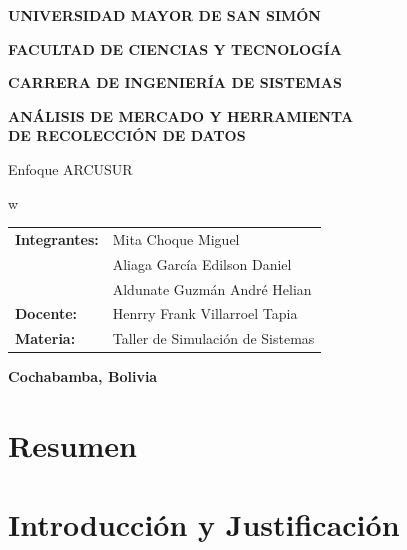 \documentclass[12pt, a4paper]{article}
\begin{document}


\setlength{\parindent}{0pt}

\begin{titlepage}
\centering
{\large\bfseries UNIVERSIDAD MAYOR DE SAN SIMÓN\par}
\vspace{4pt}
{\bfseries FACULTAD DE CIENCIAS Y TECNOLOGÍA\par}
\vspace{4pt}
{\bfseries CARRERA DE INGENIERÍA DE SISTEMAS\par}

\vspace*{\fill}
{\huge\bfseries ANÁLISIS DE MERCADO Y HERRAMIENTA\\DE RECOLECCIÓN DE DATOS\par}
\vspace{0.8cm}
{\Large Enfoque ARCUSUR\par}
\vspace*{\fill}w

\begin{flushleft}
\begin{tabular}{@{}ll}
\textbf{Integrantes:} & Mita Choque Miguel \\[4pt]
                      & Aliaga García Edilson Daniel \\[4pt]
                      & Aldunate Guzmán André Helian \\[4pt]
\textbf{Docente:}     & Henrry Frank Villarroel Tapia \\[4pt]
\textbf{Materia:}     & Taller de Simulación de Sistemas \\
\end{tabular}
\end{flushleft}

\vspace{1.5cm}
{\bfseries Cochabamba, Bolivia\par}
\end{titlepage}

\tableofcontents
\newpage

\section*{Resumen}

\newpage

\setlength{\parskip}{10pt}

\section{Introducción y Justificación}
\end{document}
